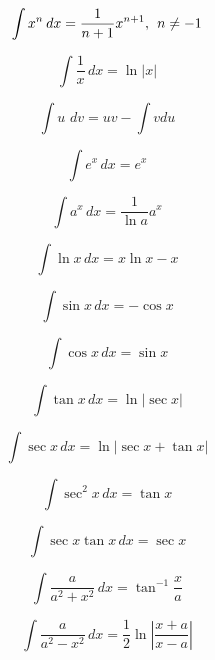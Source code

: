\documentclass{article}
\newcommand{\dx}{\hspace{2pt}dx}
\newcommand{\dd}[1]{\hspace{2pt}d#1}
\begin{document}
\begin{multicols}{2}

\begin{equation}
\int x^n \dx = \frac{1}{n+1}x^{n+1}, \hspace{1ex} n\neq-1
\end{equation}

\begin{equation}
\int \frac{1}{x}\dx = \ln |x|
\end{equation}

\begin{equation}
\int u \hspace{2pt} \dd{v} = uv - \int v du
\end{equation}

\begin{equation}
\int e^x \dx = e^x 
\end{equation}

\begin{equation}
\int a^x \dx = \frac{1}{\ln a} a^x
\end{equation}

\begin{equation}
\int \ln x \dx = x \ln x - x
\end{equation}


\begin{equation}
\int \sin x \dx = -\cos x
\end{equation}

\begin{equation}
\int \cos x \dx = \sin x
\end{equation}

\begin{equation}
\int \tan x \dx = \ln |\sec x| 
\end{equation}

\begin{equation}
\int \sec x \dx = \ln |\sec x + \tan x|
\end{equation}

\begin{equation}
\int \sec^2 x \dx = \tan x
\end{equation}

\begin{equation}
\int \sec x \tan x \dx = \sec x
\end{equation}

\begin{equation}
\int \frac{a}{a^2+x^2}\dx = \tan^{-1}\frac{x}{a}
\end{equation}

\begin{equation}
\int \frac{a}{a^2-x^2}\dx = \frac{1}{2}\ln\left|\frac{x+a}{x-a}\right|
\end{equation}

\end{multicols}
\end{document}

